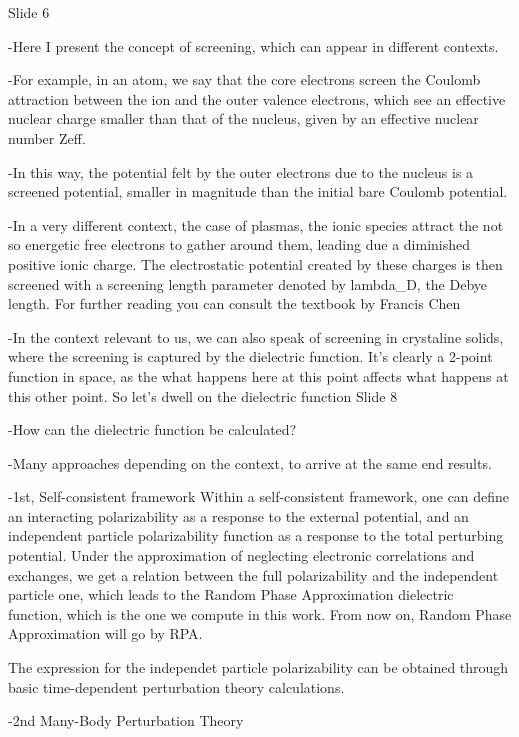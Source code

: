 
Slide 6

-Here I present the concept of screening, which can appear in different contexts.

-For example, in an atom, we say that the core electrons screen the Coulomb 
attraction between the ion and the outer valence electrons, which see an effective 
nuclear charge smaller than that of the nucleus, given by an effective nuclear number
Zeff.

-In this way, the potential felt by the outer electrons due to the nucleus is a screened 
potential, smaller in magnitude than the initial bare Coulomb potential.

-In a very different context, the case of plasmas, the ionic species attract the not so 
energetic free electrons to gather around them, leading due a diminished positive ionic 
charge. The electrostatic potential created by these charges is then screened with a 
screening length parameter denoted by lambda_D, the Debye length. For further reading
you can consult the textbook by Francis Chen

-In the context relevant to us, we can also speak of screening in crystaline solids,
where the screening is captured by the dielectric function. It's clearly a 2-point
function in space, as the what happens here at this point affects what happens at
this other point. So let's dwell on the dielectric function
Slide 8

-How can the dielectric function be calculated?

-Many approaches depending on the context, to arrive at the same end results.

-1st, Self-consistent framework
Within a self-consistent framework, one can define an interacting polarizability 
as a response to the external potential, and an independent particle polarizability 
function as a response to the total perturbing potential. Under the approximation of 
neglecting electronic correlations and exchanges, we get a relation between the 
full polarizability and the independent particle one, which leads to the Random 
Phase Approximation dielectric function, which is the one we compute in this work. 
From now on, Random Phase Approximation will go by RPA.

The expression for the independet particle polarizability can be obtained through 
basic time-dependent perturbation theory calculations.

-2nd Many-Body Perturbation Theory

